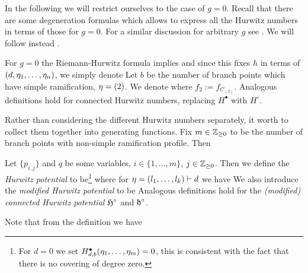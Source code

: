 \documentclass[../main/main.tex]{subfiles}
\begin{document}
In the following we will restrict ourselves to the case of $g=0$. Recall that there are some degeneration formulas which allows to express all the Hurwitz numbers in terms of those for $g=0$. For a similar discussion for arbitrary $g$ see \cite[§10]{CM}. We will follow instead \cite[§§2.2,2.3]{O1}. 

For $g=0$ the Riemann-Hurwitz formula implies
and since this fixes $h$ in terms of $(d,\eta_1,\ldots,\eta_n)$, we simply denote
Let $b$ be the number of branch points which have simple ramification, \ie $\eta=(2)$. We denote
where $f_2:=f_{C_{(2)}}$. Analogous definitions hold for connected Hurwitz numbers, replacing $H^\bullet$ with $H^\circ$. 

Rather than considering the different Hurwitz numbers separately, it worth to collect them together into generating functions. Fix $m\in\mathbb Z_{\geq0}$ to be the number of branch points with non-simple ramification profile. Then

\begin{definition}
	Let $\{p_{i,j}\}$ and $q$ be some variables, $i\in\{1,\ldots,m\}$, $j\in\mathbb Z_{\geq0}$. Then we define the \emph{Hurwitz potential} to be\footnote{For $d=0$ we set $H_{d,b}^\bullet(\eta_1,\ldots,\eta_m)=0$, this is consistent with the fact that there is no covering of degree zero.}
	where for $\eta=(l_1,\ldots,l_k)\vdash d$ we have
	We also introduce the \emph{modified Hurwitz potential} to be
	Analogous definitions hold for the \emph{(modified) connected Hurwitz potential} $\mathfrak H^\circ$ and $\mathfrak h^\circ$. 
\end{definition}

Note that from the definition we have
\end{document}
